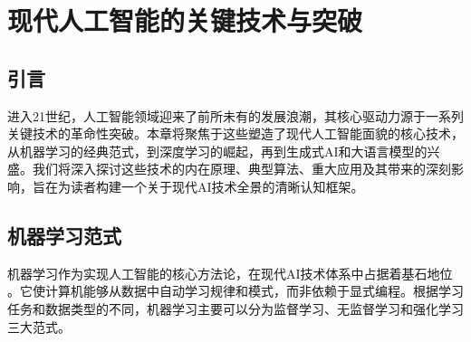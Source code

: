 \chapter{现代人工智能的关键技术与突破}
\label{chap:modern_ai_tech}

\section{引言}
\label{sec:intro_chap2}
进入21世纪，人工智能领域迎来了前所未有的发展浪潮，其核心驱动力源于一系列关键技术的革命性突破。本章将聚焦于这些塑造了现代人工智能面貌的核心技术，从机器学习的经典范式，到深度学习的崛起，再到生成式AI和大语言模型的兴盛。我们将深入探讨这些技术的内在原理、典型算法、重大应用及其带来的深刻影响，旨在为读者构建一个关于现代AI技术全景的清晰认知框架。

\section{机器学习范式}
\label{sec:ml_paradigms}
机器学习作为实现人工智能的核心方法论，在现代AI技术体系中占据着基石地位 \cite{机器学习范式}。它使计算机能够从数据中自动学习规律和模式，而非依赖于显式编程。根据学习任务和数据类型的不同，机器学习主要可以分为监督学习、无监督学习和强化学习三大范式。

